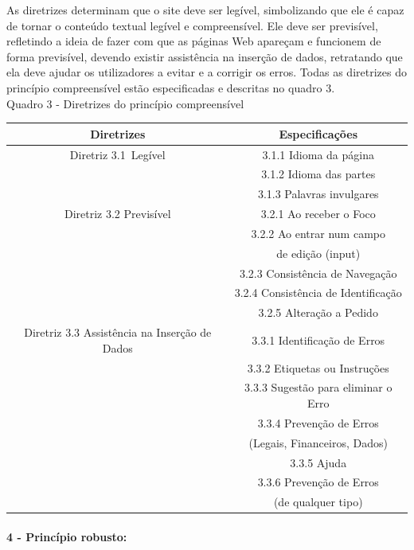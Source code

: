\documentclass[a4paper]{article}
\begin{document}
\begin{titlepage}
As diretrizes determinam que o site deve ser legível, simbolizando que ele é capaz de tornar o conteúdo textual legível e compreensível. Ele deve ser previsível, refletindo a ideia de fazer com que as páginas Web apareçam e funcionem de forma previsível, devendo existir assistência na inserção de dados, retratando que ela deve ajudar os utilizadores a evitar e a corrigir os erros. Todas as diretrizes do princípio compreensível estão especificadas e descritas no quadro 3.\\

Quadro 3 - Diretrizes do princípio compreensível\\[-1cm]
\begin{center}
	\fontsize{8pt}{8pt}\selectfont
	\begin{longtable}{|c|c|}
		\hline
		Diretrizes & Especificações \\
		\hline
		Diretriz 3.1 Legível& 3.1.1 Idioma da página\\
		& 3.1.2 Idioma das partes\\
		& 3.1.3 Palavras invulgares\\
		\hline
		Diretriz 3.2 Previsível & 3.2.1 Ao receber o Foco\\
		& 3.2.2 Ao entrar num campo\\
		& de edição (input)\\
		& 3.2.3 Consistência de Navegação\\
		& 3.2.4 Consistência de Identificação\\
		& 3.2.5 Alteração a Pedido\\
		\hline
		Diretriz 3.3 Assistência na Inserção de Dados& 3.3.1 Identificação de Erros\\
		& 3.3.2 Etiquetas ou Instruções\\
		& 3.3.3 Sugestão para eliminar o Erro\\
		& 3.3.4 Prevenção de Erros\\
		& (Legais, Financeiros, Dados)\\
		& 3.3.5 Ajuda\\
		& 3.3.6 Prevenção de Erros\\
		& (de qualquer tipo)\\
		\hline
	\end{longtable}
\end{center}

\paragraph{4 - Princípio robusto: }


\end{titlepage}
\end{document}
